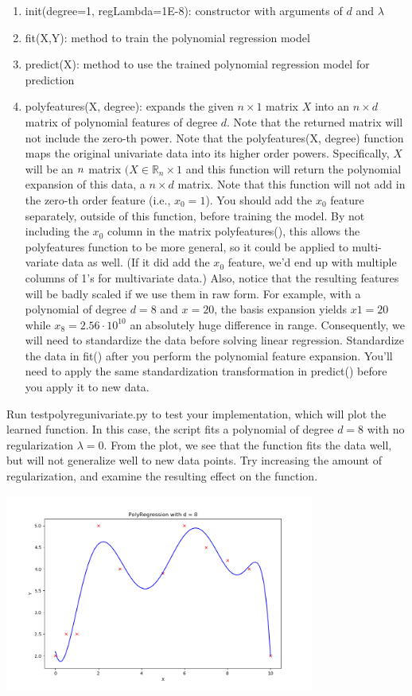\documentclass{article}
\newcommand{\field}[1]{\mathbb{#1}}
\newcommand{\1}{\mathbf{1}}
\newcommand{\R}{\field{R}} %
\begin{document}
\begin{enumerate}
    \item init(degree=1, regLambda=1E-8):  constructor with arguments of $d$ and $\lambda$
    \item fit(X,Y): method to train the polynomial regression model
    \item predict(X): method to use the trained polynomial regression model for prediction
    \item polyfeatures(X, degree): expands the given $n\times1$ matrix $X$ into an $n\times d$ matrix of polynomial features of degree $d$. Note that the returned matrix will not include the zero-th power. Note that the polyfeatures(X, degree) function maps the original univariate data into its higher order powers. Specifically, $X$ will be an $n\time1$ matrix $(X\in\R_n\times1$ and this function will return the polynomial expansion of this data,  a $n\times d$ matrix. Note that this function will not add in the zero-th order feature (i.e., $x_0= 1$). You should add the $x_0$ feature separately, outside of this function, before training the model. By not including the $x_0$ column in the matrix polyfeatures(), this allows the polyfeatures function to be more general, so it could be applied to multi-variate data as well. (If it did add the $x_0$ feature, we’d end up with multiple columns of 1’s for multivariate data.) Also, notice that the resulting features will be badly scaled if we use them in raw form. For example, with a polynomial of degree $d=8$ and $x=20$, the basis expansion yields $x1=20$ while $x_8=2.56\cdot10^{10}$ an absolutely huge difference in range. Consequently, we will need to standardize the data before solving linear regression. Standardize the data in fit() after you perform the polynomial feature expansion. You’ll need to apply the same standardization transformation in predict() before you apply it to new data.
\end{enumerate}
Run testpolyregunivariate.py to test your implementation, which will plot the learned function. In this case, the script fits a polynomial of degree $d=8$ with no regularization $\lambda=0$. From the plot, we see that the function fits the data well, but will not generalize well to new data points. Try increasing the amount of regularization, and examine the resulting effect on the function. \\

\begin{center}
    \includegraphics[width=4in]{HW1/HW1_plots/PolyFit.png}
\end{center} 
\end{document}
